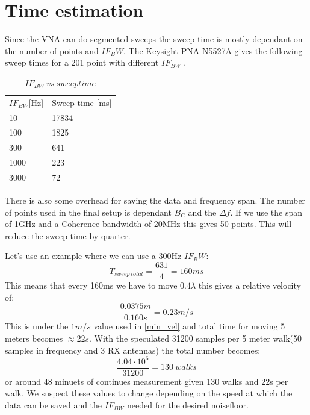 \section{Time estimation}
Since the \gls{VNA} can do segmented sweeps the sweep time is mostly dependant on the number of points and $IF_BW$.
The Keysight PNA N5527A gives the following sweep times for a 201 point with different $IF_{BW}$ \citep{Key_PNA}. \\

\begin{table}[H]
\centering
\caption{$IF_{BW} \ vs \ sweep time$}
\label{my-label}
\begin{tabular}{l|l}
\hline
$IF_{BW}${[}Hz{]} & Sweep time {[}ms{]} \\
10              & 17834               \\
100             & 1825                \\
300             & 641                 \\
1000            & 223                 \\
3000            & 72                 
\end{tabular}
\end{table}

There is also some overhead for saving the data and frequency span. The number of points used in the final setup is dependant $B_C$ and the $\Delta f$. If we use the span of 1GHz and a Coherence bandwidth of 20MHz this gives 50 points. This will reduce the sweep time by quarter.

Let's  use an example where we can use a 300Hz $IF_BW$:
\begin{equation}
T_{sweep \ total} = \frac{631}{4} = 160ms
\end{equation}
This means that every 160ms we have to move $0.4 \lambda$ this gives a relative velocity of:
\begin{equation}
\frac{0.0375m}{0.160s} = 0.23 m/s
\end{equation}
This is under the $1m/s$ value used in \autoref{min_vel}
and total time for moving 5 meters becomes $\approx 22s$.
With the speculated 31200 samples per 5 meter walk(50 samples in frequency and 3 RX antennas) the total number becomes:
\begin{equation}
\frac{4.04 \cdot 10^6}{31200} = 130 \ walks
\end{equation}
or around 48 minuets of continues measurement given 130 walks and 22s per walk. We suspect these values to change depending on the speed at which the data can be saved and the $IF_{BW}$ needed for the desired noisefloor.

